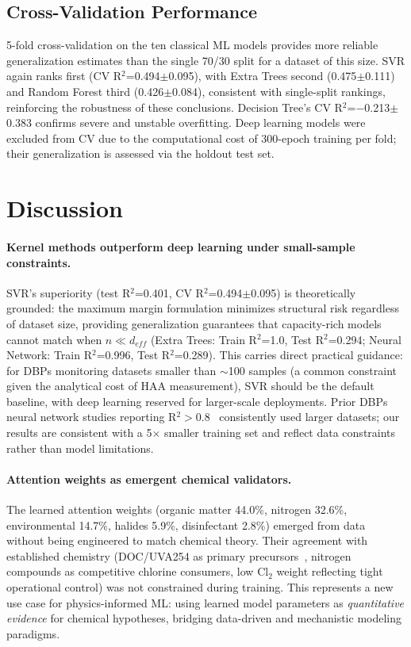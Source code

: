 \documentclass[runningheads]{llncs}
\begin{document}
\subsection{Cross-Validation Performance}

5-fold cross-validation on the ten classical ML models provides more reliable generalization estimates than the single 70/30 split for a dataset of this size. SVR again ranks first (CV R$^2$=0.494$\pm$0.095), with Extra Trees second (0.475$\pm$0.111) and Random Forest third (0.426$\pm$0.084), consistent with single-split rankings, reinforcing the robustness of these conclusions. Decision Tree's CV R$^2$=$-$0.213$\pm$0.383 confirms severe and unstable overfitting. Deep learning models were excluded from CV due to the computational cost of 300-epoch training per fold; their generalization is assessed via the holdout test set.


\section{Discussion}

\paragraph{Kernel methods outperform deep learning under small-sample constraints.}
SVR's superiority (test R$^2$=0.401, CV R$^2$=0.494$\pm$0.095) is theoretically grounded: the maximum margin formulation minimizes structural risk regardless of dataset size, providing generalization guarantees that capacity-rich models cannot match when $n \ll d_{eff}$ (Extra Trees: Train R$^2$=1.0, Test R$^2$=0.294; Neural Network: Train R$^2$=0.996, Test R$^2$=0.289). This carries direct practical guidance: for DBPs monitoring datasets smaller than $\sim$100 samples (a common constraint given the analytical cost of HAA measurement), SVR should be the default baseline, with deep learning reserved for larger-scale deployments. Prior DBPs neural network studies reporting R$^2>0.8$~\cite{li2018drinking} consistently used larger datasets; our results are consistent with a 5$\times$ smaller training set and reflect data constraints rather than model limitations.

\paragraph{Attention weights as emergent chemical validators.}
The learned attention weights (organic matter 44.0\%, nitrogen 32.6\%, environmental 14.7\%, halides 5.9\%, disinfectant 2.8\%) emerged from data without being engineered to match chemical theory. Their agreement with established chemistry (DOC/UVA254 as primary precursors~\cite{reckhow1990chlorination}, nitrogen compounds as competitive chlorine consumers, low Cl$_2$ weight reflecting tight operational control) was not constrained during training. This represents a new use case for physics-informed ML: using learned model parameters as \textit{quantitative evidence} for chemical hypotheses, bridging data-driven and mechanistic modeling paradigms.
\end{document}
